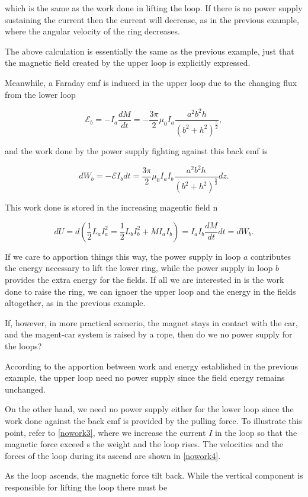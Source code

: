 \documentclass[english,a4paper,12pt]{report}
\begin{document}
{which is the same as the work done in lifting the loop. If there is no power supply sustaining the current then the current will decrease, as in the previous example, where the angular velocity of the ring decreases.

The above calculation is essentially the same as the previous example, just that the magnetic field created by the upper loop is explicitly expressed. 

Meanwhile, a Faraday emf is induced in the upper loop due to the changing flux from the lower loop 

\begin{equation}
    \mathcal{E}_{b} = -I_{a}\frac{dM}{dt} = -\frac{3\pi }{2} \mu_0 I_{a}\frac{a^2b^2h}{(b^2+h^2)^{\frac{5}{2} } },      
\end{equation}

and the work done by the power supply fighting against this back emf is 

\begin{equation}
    dW_{b} = - \mathcal{E}I_{b}dt = \frac{3\pi }{2} \mu_0 I_{a}I_{b} \frac{a^2b^2h}{(b^2+h^2)^{\frac{5}{2} } }dz.      
\end{equation}

This work done is stored in the increasing magentic field n

\begin{equation}
    dU = d\left( \frac{1}{2}L_{a}I_{a}^2 = \frac{1}{2}L_{b}I_{b}^2 + MI_{a}I_{b}         \right) = I_{a}I_{b}\frac{dM}{dt}dt = dW_{b}.    
\end{equation}

If we care to apportion things this way, the power supply in loop \(a\) contributes the energy necessary to lift the lower ring, while the power supply in loop \(b\) provides the extra energy for the fields. If all we are interested in is the work done to raise the ring, we can ignoer the upper loop and the energy in the fields altogether, as in the previous example.
} 

{If, however, in more practical scenerio, the magnet stays in contact with the car, and the magent-car system is raised by a rope, then do we no power supply for the loops?}
{According to the apportion between work and energy established in the previous example, the upper loop need no power supply since the field energy remains unchanged. 

On the other hand, we need no power supply either for the lower loop since the work done against the back emf is provided by the pulling force. To illustrate this point, refer to \cref{nowork3}, where we increase the current \(I\) in the loop so that the magnetic force exceed s the weight and the loop rises. The velocities and the forces of the loop during its ascend are shown in \cref{nowork4}.

As the loop ascends, the magnetic force tilt back. While the vertical component is responsible for lifting the loop there must be } 
\end{document}
